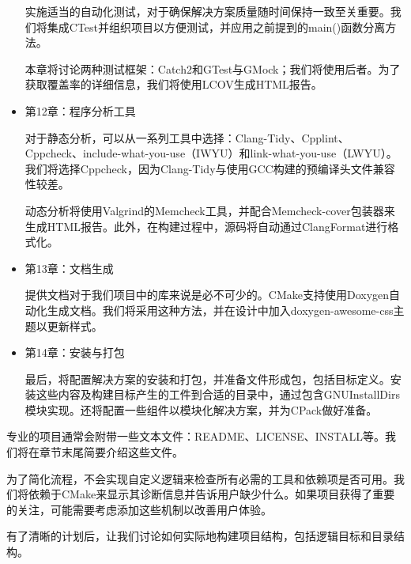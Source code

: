 \begin{itemize}
实施适当的自动化测试，对于确保解决方案质量随时间保持一致至关重要。我们将集成CTest并组织项目以方便测试，并应用之前提到的main()函数分离方法。

本章将讨论两种测试框架：Catch2和GTest与GMock；我们将使用后者。为了获取覆盖率的详细信息，我们将使用LCOV生成HTML报告。

\item
第12章：程序分析工具

对于静态分析，可以从一系列工具中选择：Clang-Tidy、Cpplint、Cppcheck、include-what-you-use（IWYU）和link-what-you-use（LWYU）。我们将选择Cppcheck，因为Clang-Tidy与使用GCC构建的预编译头文件兼容性较差。

动态分析将使用Valgrind的Memcheck工具，并配合Memcheck-cover包装器来生成HTML报告。此外，在构建过程中，源码将自动通过ClangFormat进行格式化。

\item
第13章：文档生成

提供文档对于我们项目中的库来说是必不可少的。CMake支持使用Doxygen自动化生成文档。我们将采用这种方法，并在设计中加入doxygen-awesome-css主题以更新样式。

\item
第14章：安装与打包

最后，将配置解决方案的安装和打包，并准备文件形成包，包括目标定义。安装这些内容及构建目标产生的工件到合适的目录中，通过包含GNUInstallDirs模块实现。还将配置一些组件以模块化解决方案，并为CPack做好准备。
\end{itemize}

专业的项目通常会附带一些文本文件：README、LICENSE、INSTALL等。我们将在章节末尾简要介绍这些文件。

为了简化流程，不会实现自定义逻辑来检查所有必需的工具和依赖项是否可用。我们将依赖于CMake来显示其诊断信息并告诉用户缺少什么。如果项目获得了重要的关注，可能需要考虑添加这些机制以改善用户体验。

有了清晰的计划后，让我们讨论如何实际地构建项目结构，包括逻辑目标和目录结构。


































